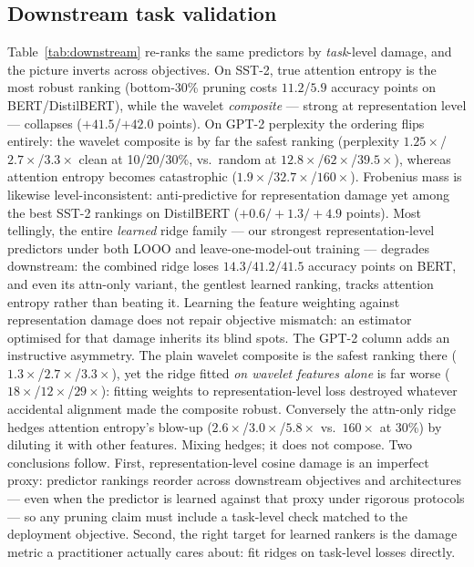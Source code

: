 \documentclass[conference]{IEEEtran}
\begin{document}
\subsection{Downstream task validation}
\label{sec:downstream}
Table~\ref{tab:downstream} re-ranks the same predictors by
\emph{task}-level damage, and the picture inverts across objectives.
On SST-2, true attention entropy is the most robust ranking (bottom-30\%
pruning costs $11.2$/$5.9$ accuracy points on BERT/DistilBERT), while
the wavelet \emph{composite} --- strong at representation level ---
collapses ($+41.5$/$+42.0$ points). On GPT-2 perplexity the ordering
flips entirely: the wavelet composite is by far the safest ranking
(perplexity $1.25\times$/$2.7\times$/$3.3\times$ clean at 10/20/30\%,
vs.\ random at $12.8\times$/$62\times$/$39.5\times$), whereas attention
entropy becomes catastrophic ($1.9\times$/$32.7\times$/$160\times$).
Frobenius mass is likewise level-inconsistent: anti-predictive for
representation damage yet among the best SST-2 rankings on DistilBERT
($+0.6/+1.3/+4.9$ points). Most tellingly, the entire \emph{learned}
ridge family --- our strongest representation-level predictors under
both LOOO and leave-one-model-out training --- degrades downstream:
the combined ridge loses $14.3/41.2/41.5$ accuracy points on BERT, and
even its attn-only variant, the gentlest learned ranking, tracks
attention entropy rather than beating it. Learning the feature weighting
against representation damage does not repair objective mismatch: an
estimator optimised for that damage inherits its blind spots. The GPT-2
column adds an instructive asymmetry. The plain wavelet composite is the
safest ranking there ($1.3\times$/$2.7\times$/$3.3\times$), yet the
ridge fitted \emph{on wavelet features alone} is far worse
($18\times$/$12\times$/$29\times$): fitting weights to
representation-level loss destroyed whatever accidental alignment made
the composite robust. Conversely the attn-only ridge hedges attention
entropy's blow-up ($2.6\times$/$3.0\times$/$5.8\times$ vs.\ $160\times$
at 30\%) by diluting it with other features. Mixing hedges; it does not
compose. Two conclusions follow. First,
representation-level cosine damage is an imperfect proxy: predictor
rankings reorder across downstream objectives and architectures --- even
when the predictor is learned against that proxy under rigorous
protocols --- so any pruning claim must include a task-level check
matched to the deployment objective. Second, the right target for
learned rankers is the damage metric a practitioner actually cares
about: fit ridges on task-level losses directly.
\end{document}
